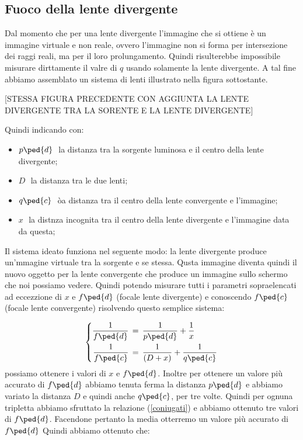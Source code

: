 \subsection{Fuoco della lente divergente}

Dal momento che per una lente divergente l'immagine che si ottiene è un immagine virtuale e non reale, ovvero l'immagine non si forma per intersezione dei raggi reali, ma per il loro prolungamento. Quindi risulterebbe impossibile misurare dirttamente il valre di $q$ usando solamente la lente divergente.
A tal fine abbiamo assemblato un sistema di lenti illustrato nella figura sottostante.

[STESSA FIGURA PRECEDENTE CON AGGIUNTA LA LENTE DIVERGENTE TRA LA SORENTE E LA LENTE DIVERGENTE]

Quindi indicando con:
\begin{itemize}
	\item{$p\ped{d}\,\,$ la distanza tra la sorgente luminosa e il centro della lente divergente;}
	\item{$D\,\,$ la distanza tra le due lenti;}
	\item{$q\ped{c}\,\,$ òa distanza tra il centro della lente convergente e l'immagine;}
	\item{$x\,\,$ la distnza incognita tra il centro della lente divergente e l'immagine data da questa;}
\end{itemize}
Il sistema ideato funziona nel seguente modo: la lente divergente produce un'mmagine virtuale tra la sorgente e se stessa. Qusta immagine diventa quindi il nuovo oggetto per la lente convergente che produce un immagine sullo schermo che noi possiamo vedere. Quindi potendo misurare tutti i parametri sopraelencati ad eccezzione di $x$ e $f\ped{d}$ (focale lente divergente) e conoscendo $f\ped{c}$ (focale lente convergente) risolvendo questo semplice sistema:

\begin{equation}
 \left\{
  \begin{aligned}
    \frac{1}{f\ped{d}} & \,=\, \frac{1}{p\ped{d}} + \frac{1}{x}\\
    \frac{1}{f\ped{c}} & \,=\, \frac{1}{(D + x)} + \frac{1}{q\ped{c}}
  \end{aligned}
\right.
\end{equation}
%
possiamo ottenere i valori di $x$ e $f\ped{d}$. Inoltre per ottenere un valore più accurato di $f\ped{d}$ abbiamo tenuta ferma la distanza $p\ped{d}$ e abbiamo variato la distanza $D$ e quindi anche $q\ped{c}$, per tre volte. Quindi per ognuna tripletta abbiamo sfruttato la relazione (\ref{coniugati}) e abbiamo ottenuto tre valori di $f\ped{d}$. Facendone pertanto la media otterremo un valore più accurato di $f\ped{d}$
Quindi abbiamo ottenuto che:

